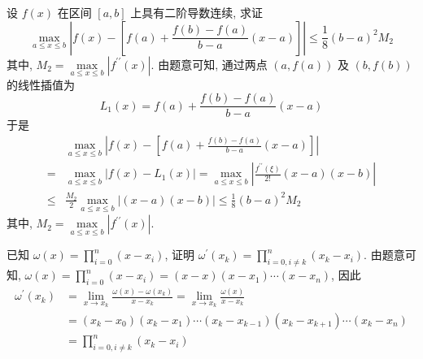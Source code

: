   \begin{tcolorbox}[enhanced,colback=10,colframe=9,breakable,coltitle=green!25!black,title=2024]
 设 $ f(x) $ 在区间 $ [a, b] $ 上具有二阶导数连续, 求证
$$
\max _{a \leqslant x \leqslant b}\left|f(x)-\left[f(a)+\frac{f(b)-f(a)}{b-a}(x-a)\right]\right| \leqslant \frac{1}{8}(b-a)^{2} M_{2}
$$
其中, $ M_{2}=\max\limits _{a \leqslant x \leqslant b}\left|f^{\prime \prime}(x)\right| $.
\tcblower
 由题意可知, 通过两点 $ (a, f(a)) $ 及 $ (b, f(b)) $ 的线性插值为
$$
L_{1}(x)=f(a)+\frac{f(b)-f(a)}{b-a}(x-a)
$$
于是
$$
\begin{aligned}
& \max _{a \leqslant x \leqslant b}\left|f(x)-\left[f(a)+\frac{f(b)-f(a)}{b-a}(x-a)\right]\right| \\
= & \max _{a \leqslant x \leqslant b}\left|f(x)-L_{1}(x)\right|=\max _{a \leqslant x \leqslant b}\left|\frac{f^{\prime \prime}(\xi)}{2!}(x-a)(x-b)\right| \\
\leqslant & \frac{M_{2}}{2} \max _{a \leqslant x \leqslant b}|(x-a)(x-b)| \leqslant \frac{1}{8}(b-a)^{2} M_{2}
\end{aligned}
$$
其中, $ M_{2}=\max\limits _{a \leqslant x \leqslant b}\left|f^{\prime \prime}(x)\right| $.
  \end{tcolorbox}


    \begin{tcolorbox}[enhanced,colback=10,colframe=9,breakable,coltitle=green!25!black,title=2024]
 已知 $ \omega(x)=\prod\limits_{i=0}^{n}\left(x-x_{i}\right) $, 证明 $ \omega^{\prime}\left(x_{k}\right)=\prod\limits_{i=0, i \neq k}^{n}\left(x_{k}-x_{i}\right) $.
 \tcblower
 由题意可知, $ \omega(x)=\prod\limits_{i=0}^{n}\left(x-x_{i}\right)=(x-x)\left(x-x_{1}\right) \cdots\left(x-x_{n}\right) $, 因此
$$
\begin{aligned}
\omega^{\prime}\left(x_{k}\right) & =\lim _{x \rightarrow x_{k}} \frac{\omega(x)-\omega\left(x_{k}\right)}{x-x_{k}}=\lim _{x \rightarrow x_{k}} \frac{\omega(x)}{x-x_{k}} \\
& =\left(x_{k}-x_{0}\right)\left(x_{k}-x_{1}\right) \cdots\left(x_{k}-x_{k-1}\right)\left(x_{k}-x_{k+1}\right) \cdots\left(x_{k}-x_{n}\right) \\
& =\prod_{i=0, i \neq k}^{n}\left(x_{k}-x_{i}\right)
\end{aligned}
$$
  \end{tcolorbox}

